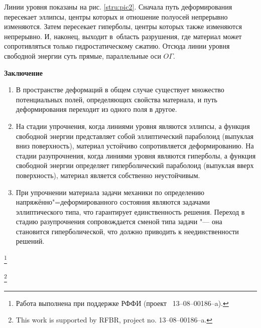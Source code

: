 Линии уровня показаны на рис. \ref{stru:pic2}. Сначала путь деформирования пересекает эллипсы, центры которых и отношение полуосей непрерывно изменяются. Затем пересекает гиперболы, центры которых также изменяются непрерывно. И, наконец, выходит в~область разрушения, где материал может сопротивляться только гидростатическому сжатию. Отсюда линии уровня свободной энергии суть прямые, параллельные оси $O\Gamma$.



\smallskip



\textbf{Заключение}

 

\begin{enumerate}

	\item[1.] В пространстве деформаций в общем случае существует множество потенциальных полей, определяющих свойства материала, и путь деформирования переходит из одного поля в другое.

\item[2.] На стадии упрочнения, когда линиями уровня являются эллипсы, а функция свободной энергии представляет собой эллиптический параболоид (выпуклая вниз поверхность), материал устойчиво сопротивляется деформированию. На стадии разупрочнения, когда линиями уровня являются гиперболы, а функция свободной энергии определяет гиперболический параболоид (выпуклая вверх поверхность), материал является собственно неустойчивым.

\item[3.] При упрочнении материала задачи механики по определению напряжённо"=деформированного состояния являются задачами эллиптического типа, что гарантирует единственность решения. Переход в стадию разупрочнения сопровождается сменой типа задачи "--- она становится гиперболической, что должно приводить к неединственности решений.

\end{enumerate}





\thanks{Работа выполнена при поддержке РФФИ (проект \No~13--08--00186--a).}



\thanks{This work is supported by RFBR, project no. 13--08--00186--a.}







